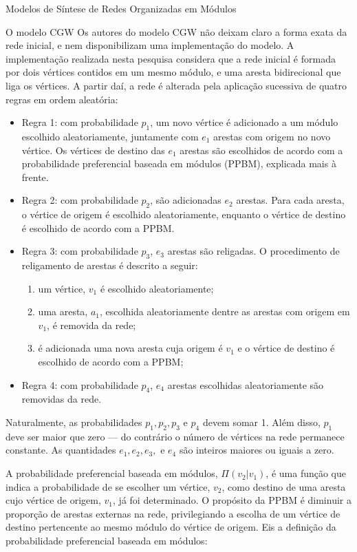 \begin{section}{Modelos de Síntese de Redes Organizadas em Módulos}
\begin{subsection}{O modelo CGW}
Os autores do modelo CGW não deixam claro a forma exata da rede inicial, e nem disponibilizam uma implementação do modelo. A implementação realizada nesta pesquisa considera que a rede inicial é formada por dois vértices contidos em um mesmo módulo, e uma aresta bidirecional que liga os vértices. A partir daí, a rede é alterada pela aplicação sucessiva de quatro regras em ordem aleatória:

\begin{itemize}
	
	\item Regra 1: com probabilidade $p_1$, um novo vértice é adicionado a um módulo escolhido aleatoriamente, juntamente com $e_1$ arestas com origem no novo vértice. Os vértices de destino das $e_1$ arestas são escolhidos de acordo com a probabilidade preferencial baseada em módulos (PPBM), explicada mais à frente.
	
	\item Regra 2: com probabilidade $p_2$, são adicionadas $e_2$ arestas. Para cada aresta, o vértice de origem é escolhido aleatoriamente, enquanto o vértice de destino é escolhido de acordo com a PPBM.
	
	\item Regra 3: com probabilidade $p_3$, $e_3$ arestas são religadas. O procedimento de religamento de arestas é descrito a seguir:
	
	\begin{enumerate}
		\item um vértice, $v_1$ é escolhido aleatoriamente;
		\item uma aresta, $a_1$, escolhida aleatoriamente dentre as arestas com origem em $v_1$, é removida da rede;
		\item é adicionada uma nova aresta cuja origem é $v_1$ e o vértice de destino é escolhido de acordo com a PPBM;
	\end{enumerate}
	
	\item Regra 4: com probabilidade $p_4$, $e_4$ arestas escolhidas aleatoriamente são removidas da rede.
	
\end{itemize}

Naturalmente, as probabilidades $p_1, p_2, p_3$ e $p_4$ devem somar 1. Além disso, $p_1$ deve ser maior que zero --- do contrário o número de vértices na rede permanece constante. As quantidades $e_1, e_2, e_3, $ e $e_4$ são inteiros maiores ou iguais a zero.

A probabilidade preferencial baseada em módulos, $\Pi(v_2|v_1)$, é uma função que indica a probabilidade de se escolher um vértice, $v_2$, como destino de uma aresta cujo vértice de origem, $v_1$, já foi determinado. O propósito da PPBM é diminuir a proporção de arestas externas na rede, privilegiando a escolha de um vértice de destino pertencente ao mesmo módulo do vértice de origem. Eis a definição da probabilidade preferencial baseada em módulos:


\end{subsection}
\end{section}
